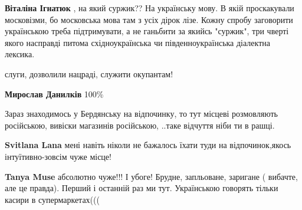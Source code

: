 \begin{itemize}
\begin{itemize}
\textbf{Віталіна Ігнатюк} , на який суржик?? На українську мову. В якій
проскакували московізми, бо московська мова там з усіх дірок лізе. Кожну спробу
заговорити українською треба підтримувати, а не ганьбити за якийсь "суржик",
три чверті якого насправді питома східноукраїнська чи південноукраїнська
діалектна лексика.
\end{itemize}

 
слуги, дозволили нацраді, служити окупантам!

\begin{itemize}
 
\textbf{Мирослав Данилків} 100\%
\end{itemize}

 
Зараз знаходимось у Бердянську на відпочинку, то тут місцеві розмовляють
російською, вивіски магазинів російською, ..таке відчуття ніби ти в рашці.

\begin{itemize}
 
\textbf{Svitlana Lana} мені навіть ніколи не бажалось їхати туди на відпочинок,якось інтуїтивно-зовсім чуже місце!

 
\textbf{Tanya Muse} абсолютно чуже!!! І убоге! Брудне, запльоване, заригане ( вибачте, але це правда). Перший і останній раз ми тут.
Українською говорять тільки касири в супермаркетах(((


\end{itemize}
\end{itemize}
